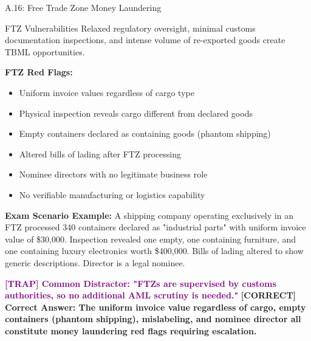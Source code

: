 \documentclass[11pt,a4paper]{beamer}
\newcommand{\trap}[1]{\textcolor{purple}{\textbf{[TRAP] #1}}}
\newcommand{\correct}[1]{\textcolor{green!50!black}{\textbf{[CORRECT] #1}}}
\begin{document}
	\begin{frame}{A.16: Free Trade Zone Money Laundering}
		\begin{block}{FTZ Vulnerabilities}
			Relaxed regulatory oversight, minimal customs documentation inspections, and intense volume of re-exported goods create TBML opportunities.
		\end{block}
		\textbf{FTZ Red Flags:}
		\begin{itemize}
			\item Uniform invoice values regardless of cargo type
			\item Physical inspection reveals cargo different from declared goods
			\item Empty containers declared as containing goods (phantom shipping)
			\item Altered bills of lading after FTZ processing
			\item Nominee directors with no legitimate business role
			\item No verifiable manufacturing or logistics capability
		\end{itemize}
		\textbf{Exam Scenario Example:}
		A shipping company operating exclusively in an FTZ processed 340 containers declared as "industrial parts" with uniform invoice value of \$30,000. Inspection revealed one empty, one containing furniture, and one containing luxury electronics worth \$400,000. Bills of lading altered to show generic descriptions. Director is a legal nominee.
		
		\trap{Common Distractor: "FTZs are supervised by customs authorities, so no additional AML scrutiny is needed."}
		\correct{Correct Answer: The uniform invoice value regardless of cargo, empty containers (phantom shipping), mislabeling, and nominee director all constitute money laundering red flags requiring escalation.}
	\end{frame}
	
	
\end{document}
